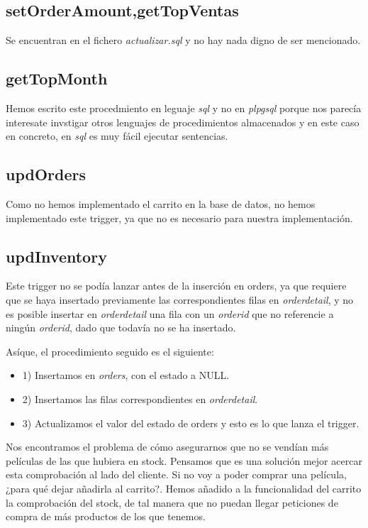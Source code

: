 \documentclass[nochap]{apuntes}
\begin{document}
\subsection{setOrderAmount,getTopVentas}
Se encuentran en el fichero \textit{actualizar.sql} y no hay nada digno de ser mencionado.

\subsection{getTopMonth}

Hemos escrito este procedmiento en leguaje \textit{sql} y no en \textit{plpgsql} porque nos parecía interesate invstigar otros lenguajes de procedimientos almacenados y en este caso en concreto, en \textit{sql} es muy fácil ejecutar sentencias.

\subsection{updOrders}

Como no hemos implementado el carrito en la base de datos, no hemos implementado este trigger, ya que no es necesario para nuestra implementación.

\subsection{updInventory}
Este trigger no se podía lanzar antes de la inserción en orders, ya que requiere que se haya insertado previamente las correspondientes filas en \textit{orderdetail}, y no es posible insertar en \textit{orderdetail} una fila con un \textit{orderid} que no referencie a ningún \textit{orderid}, dado que todavía no se ha insertado.

Asíque, el  procedimiento seguido es el siguiente:
\begin{itemize}
\item 1) Insertamos en \textit{orders}, con el estado a NULL.
\item 2) Insertamos las filas correspondientes en \textit{orderdetail}.
\item 3) Actualizamos el valor del estado de orders y esto es lo que lanza el trigger.
\end{itemize}

Nos encontramos el problema de cómo asegurarnos que no se vendían más películas de las que hubiera en stock. Pensamos que es una solución mejor acercar esta comprobación al lado del cliente. Si no voy a poder comprar una película, ¿para qué dejar añadirla al carrito?. Hemos añadido a la funcionalidad del carrito la comprobación del stock, de tal manera que no puedan llegar peticiones de compra de más productos de los que tenemos.
\end{document}
